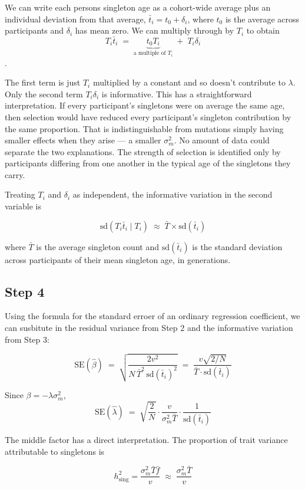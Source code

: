 \documentclass{article}
\begin{document}
We can write each persons singleton age as a cohort-wide average plus an individual deviation from that average, $\bar t_i = t_0 + \delta_i$, where $t_0$ is the average across participants and $\delta_i$ has mean zero. We can multiply through by $T_{i}$ to obtain $$T_i \bar t_i \;=\; \underbrace{t_0 T_i}_{\text{a multiple of } T_i} \;+\; T_i \delta_i$$.

The first term is just $T_{i}$ multiplied by a constant and so doesn't contribute to $\lambda$. Only the second term $T_{i} \delta_i$ is informative. This has a straightforward interpretation. If every participant’s singletons were on average the same age, then selection would have reduced every participant’s singleton contribution by the same proportion. That is indistinguishable from mutations simply having smaller effects when they arise — a smaller $\sigma^2_m$. No amount of data could separate the two explanations. The strength of selection is identified only by participants differing from one another in the typical age of the singletons they carry.

Treating $T_i$ and $\delta_i$ as independent, the informative variation in the second variable is

$$\mathrm{sd}(T_i \bar t_i \mid T_i) \;\approx\; \bar T \times \mathrm{sd}(\bar t_i)$$

where $\bar T$ is the average singleton count and $\mathrm{sd}(\bar t_i)$ is the standard deviation across participants of their mean singleton age, in generations.

\subsection{Step 4}

Using the formula for the standard erroer of an ordinary regression coefficient, we can susbitute in the residual variance from Step 2 and the informative variation from Step 3:

$$\mathrm{SE}(\hat\beta) \;=\; \sqrt{\frac{2v^2}{N \,\bar T^2\, \mathrm{sd}(\bar t_i)^2}} \;=\; \frac{v\sqrt{2/N}}{\bar T \cdot \mathrm{sd}(\bar t_i)}$$

Since $\beta = -\lambda\sigma^2_m$, $$\mathrm{SE}(\hat\lambda) \;=\; \sqrt{\frac{2}{N}} \cdot \frac{v}{\sigma^2_m \bar T} \cdot \frac{1}{\mathrm{sd}(\bar t_i)}$$

The middle factor has a direct interpretation. The proportion of trait variance attributable to singletons is

$$h^2_{\text{sing}} = \frac{\sigma^2_m \bar T \bar f}{v} \;\approx\; \frac{\sigma^2_m \bar T}{v}$$
\end{document}
